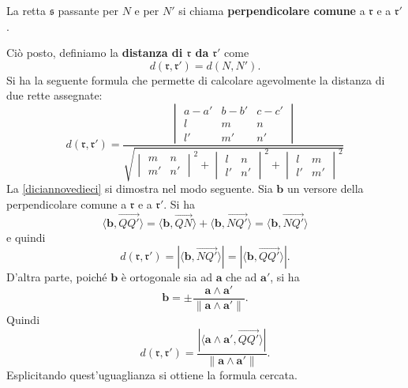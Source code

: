 \documentclass{article}
\theoremstyle{plain}
\theoremstyle{definition}
\theoremstyle{remark}
\begin{document}
\vspace{10pt}

La retta \(\mathfrak{s}\) passante per \(N\) e per \(N'\) si chiama \textbf{perpendicolare comune} a 
\(\mathfrak{r}\) e a \(\mathfrak{r}'\).

\vspace{10pt}

Ciò posto, definiamo la \textbf{distanza di \(\mathfrak{r}\) da \(\mathfrak{r}'\)} come
\[
d(\mathfrak{r}, \mathfrak{r}') = d(N, N').
\]
Si ha la seguente formula che permette di calcolare agevolmente la distanza di due rette assegnate:
\begin{equation}\label{diciannovedieci}
d(\mathfrak{r}, \mathfrak{r}') = 
\dfrac{
\begin{vmatrix}
a - a' & b - b' & c - c'\\
l & m & n\\
l' & m' & n'
\end{vmatrix}
}
{
\sqrt{
\begin{vmatrix}
m & n\\
m' & n'
\end{vmatrix}^2
+
\begin{vmatrix}
l & n\\
l' & n'
\end{vmatrix}^2
+
\begin{vmatrix}
l & m\\
l' & m'
\end{vmatrix}^2
}
}
\end{equation}
La \eqref{diciannovedieci} si dimostra nel modo seguente.
Sia \(\mathbf{b}\) un versore della perpendicolare comune a \(\mathfrak{r}\) e a \(\mathfrak{r}'\). Si ha
\[
\langle \mathbf{b}, \overrightarrow{Q Q'} \rangle
= \langle \mathbf{b}, \overrightarrow{Q N} \rangle 
+ \langle \mathbf{b}, \overrightarrow{N Q'} \rangle 
= \langle \mathbf{b}, \overrightarrow{N Q'} \rangle
\]
e quindi
\[
d(\mathfrak{r}, \mathfrak{r}')
= | \langle \mathbf{b}, \overrightarrow{N Q'} \rangle |
= | \langle \mathbf{b}, \overrightarrow{Q Q'} \rangle |.
\]
D'altra parte, poiché \(\mathbf{b}\) è ortogonale sia ad \(\mathbf{a}\) che ad \(\mathbf{a}'\), si ha
\[
\mathbf{b} = \pm \frac{\mathbf{a} \wedge \mathbf{a}'}{\|\mathbf{a} \wedge \mathbf{a}'\|}.
\]
Quindi
\[
d(\mathfrak{r}, \mathfrak{r}')
= \frac{|\langle \mathbf{a} \wedge \mathbf{a}', \overrightarrow{Q Q'} \rangle|}{\|\mathbf{a} \wedge \mathbf{a}'\|}.
\]
Esplicitando quest'uguaglianza si ottiene la formula cercata.

\vspace{10pt}
\end{document}

